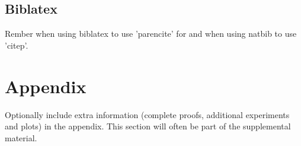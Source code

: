 \documentclass{article}
\begin{document}
\begin{table}[h]
    \centering
    
\end{table}

\subsection{Biblatex}
Rember when using biblatex to use 'parencite' for \parencite{kamtheDataEfficient2018} and when using natbib to use 'citep'.



\appendix

\section{Appendix}

Optionally include extra information (complete proofs, additional experiments and plots) in the appendix.
This section will often be part of the supplemental material.
\end{document}
